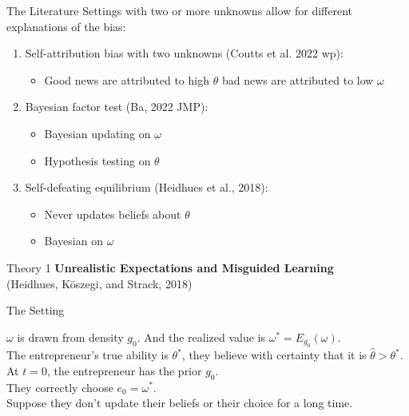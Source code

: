 \documentclass[aspectratio=169]{beamer}
\begin{document}
\begin{frame}{The Literature}
Settings with two or more unknowns allow for different explanations of the bias:\\
\bigskip
\begin{enumerate}
    \item Self-attribution bias with two unknowns (Coutts et al. 2022 wp): 
    \begin{itemize}
        \item Good news are attributed to high $\theta$ bad news are attributed to low $\omega$
    \end{itemize}
    \bigskip
    \item Bayesian factor test (Ba, 2022 JMP):
    \begin{itemize}
        \item Bayesian updating on $\omega$ 
        \item Hypothesis testing on $\theta$
    \end{itemize}
    \bigskip
    \item Self-defeating equilibrium (Heidhues et al., 2018): 
    \begin{itemize}
        \item Never updates beliefs about $\theta$
        \item Bayesian on $\omega$
    \end{itemize}
    
\end{enumerate}
\end{frame} 

\begin{frame}{Theory 1}
    \Large\textbf{Unrealistic Expectations and Misguided Learning \\}
    (Heidhues, Köszegi, and Strack, 2018)
\end{frame}

\begin{frame}{The Setting}

$\omega$ is drawn from density $g_0$. And the realized value is $\omega^*=E_{g_0}(\omega).$\\
\bigskip
The entrepreneur's true ability is $\theta^*$, they believe with certainty that it is $\hat\theta>\theta^*.$ \\
\bigskip
At $t=0$, the entrepreneur has the prior $g_0.$\\
\bigskip
They correctly choose $e_0 = \omega^*.$\\
\bigskip
\pause
Suppose they don't update their beliefs or their choice for a long time.
\end{frame}
\end{document}
